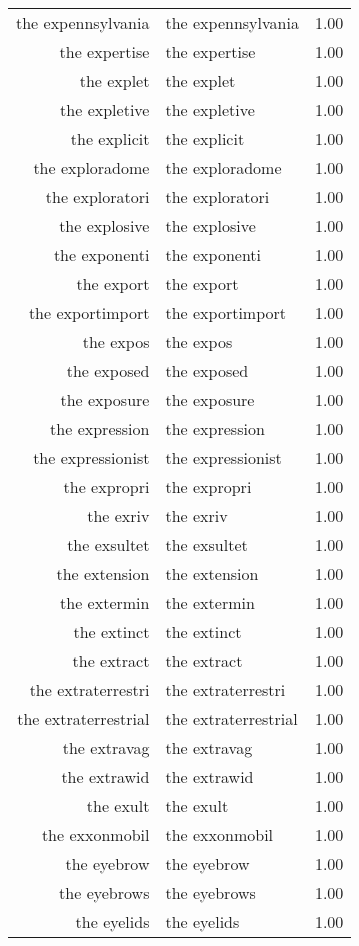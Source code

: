 \begin{table}[ht]
\begin{tabular}{rlr}
  the expennsylvania & the expennsylvania & 1.00 \\ 
  the expertise & the expertise & 1.00 \\ 
  the explet & the explet & 1.00 \\ 
  the expletive & the expletive & 1.00 \\ 
  the explicit & the explicit & 1.00 \\ 
  the exploradome & the exploradome & 1.00 \\ 
  the exploratori & the exploratori & 1.00 \\ 
  the explosive & the explosive & 1.00 \\ 
  the exponenti & the exponenti & 1.00 \\ 
  the export & the export & 1.00 \\ 
  the exportimport & the exportimport & 1.00 \\ 
  the expos & the expos & 1.00 \\ 
  the exposed & the exposed & 1.00 \\ 
  the exposure & the exposure & 1.00 \\ 
  the expression & the expression & 1.00 \\ 
  the expressionist & the expressionist & 1.00 \\ 
  the expropri & the expropri & 1.00 \\ 
  the exriv & the exriv & 1.00 \\ 
  the exsultet & the exsultet & 1.00 \\ 
  the extension & the extension & 1.00 \\ 
  the extermin & the extermin & 1.00 \\ 
  the extinct & the extinct & 1.00 \\ 
  the extract & the extract & 1.00 \\ 
  the extraterrestri & the extraterrestri & 1.00 \\ 
  the extraterrestrial & the extraterrestrial & 1.00 \\ 
  the extravag & the extravag & 1.00 \\ 
  the extrawid & the extrawid & 1.00 \\ 
  the exult & the exult & 1.00 \\ 
  the exxonmobil & the exxonmobil & 1.00 \\ 
  the eyebrow & the eyebrow & 1.00 \\ 
  the eyebrows & the eyebrows & 1.00 \\ 
  the eyelids & the eyelids & 1.00 \\ 

\end{tabular}
\end{table}
